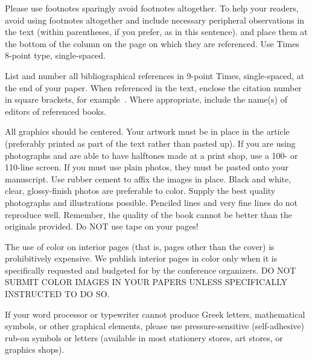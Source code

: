 \documentclass[times, 10pt,twocolumn]{article}
\begin{document}

Please use footnotes sparingly%
	avoid footnotes altogether.  To help your readers, avoid using footnotes
	altogether and include necessary peripheral observations in the text
	(within parentheses, if you prefer, as in this sentence). and place them
	at the bottom of the column on the page on which they are referenced.
	Use Times 8-point type, single-spaced.



List and number all bibliographical references in 9-point Times,
single-spaced, at the end of your paper. When referenced in the text,
enclose the citation number in square brackets, for example~\cite{ex1}.
Where appropriate, include the name(s) of editors of referenced books.


All graphics should be centered. Your artwork must be in place in the
article (preferably printed as part of the text rather than pasted up).
If you are using photographs and are able to have halftones made at a
print shop, use a 100- or 110-line screen. If you must use plain photos,
they must be pasted onto your manuscript. Use rubber cement to affix the
images in place. Black and white, clear, glossy-finish photos are
preferable to color. Supply the best quality photographs and illustrations
possible. Penciled lines and very fine lines do not reproduce well.
Remember, the quality of the book cannot be better than the originals
provided. Do NOT use tape on your pages!


The use of color on interior pages (that is, pages other than the cover)
is prohibitively expensive. We publish interior pages in color only when
it is specifically requested and budgeted for by the conference
organizers. DO NOT SUBMIT COLOR IMAGES IN YOUR PAPERS UNLESS SPECIFICALLY
INSTRUCTED TO DO SO.


If your word processor or typewriter cannot produce Greek letters,
mathematical symbols, or other graphical elements, please use
pressure-sensitive (self-adhesive) rub-on symbols or letters (available in
most stationery stores, art stores, or graphics shops).
\end{document}
